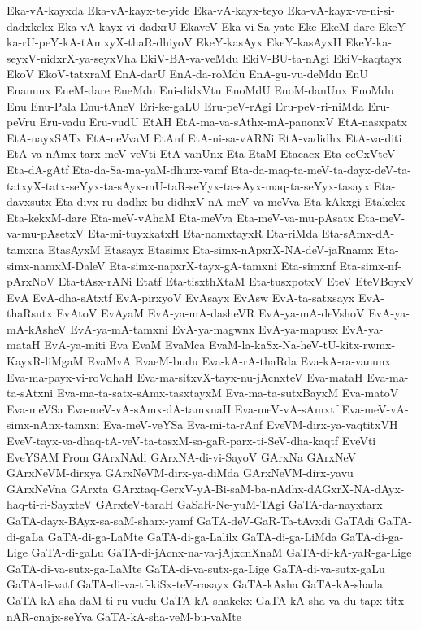 {Eka-vA-kayxda
Eka-vA-kayx-te-yide
Eka-vA-kayx-teyo
Eka-vA-kayx-ve-ni-si-dadxkekx
Eka-vA-kayx-vi-dadxrU
EkaveV
Eka-vi-Sa-yate
Eke
EkeM-dare
EkeY-ka-rU-peY-kA-tAmxyX-thaR-dhiyoV
EkeY-kasAyx
EkeY-kasAyxH
EkeY-ka-seyxV-nidxrX-ya-seyxVha
EkiV-BA-va-veMdu
EkiV-BU-ta-nAgi
EkiV-kaqtayx
EkoV
EkoV-tatxraM
EnA-darU
EnA-da-roMdu
EnA-gu-vu-deMdu
EnU
Enanunx
EneM-dare
EneMdu
Eni-didxVtu
EnoMdU
EnoM-danUnx
EnoMdu
Enu
Enu-Pala
Enu-tAneV
Eri-ke-gaLU
Eru-peV-rAgi
Eru-peV-ri-niMda
Eru-peVru
Eru-vadu
Eru-vudU
EtAH
EtA-ma-va-sAthx-mA-panonxV
EtA-nasxpatx
EtA-nayxSATx
EtA-neVvaM
EtAnf
EtA-ni-sa-vARNi
EtA-vadidhx
EtA-va-diti
EtA-va-nAmx-tarx-meV-veVti
EtA-vanUnx
Eta
EtaM
Etacacx
Eta-ceCxVteV
Eta-dA-gAtf
Eta-da-Sa-ma-yaM-dhurx-vamf
Eta-da-maq-ta-meV-ta-dayx-deV-ta-tatxyX-tatx-seYyx-ta-sAyx-mU-taR-seYyx-ta-sAyx-maq-ta-seYyx-tasayx
Eta-davxsutx
Eta-divx-ru-dadhx-bu-didhxV-nA-meV-va-meVva
Eta-kAkxgi
Etakekx
Eta-kekxM-dare
Eta-meV-vAhaM
Eta-meVva
Eta-meV-va-mu-pAsatx
Eta-meV-va-mu-pAsetxV
Eta-mi-tuyxkatxH
Eta-namxtayxR
Eta-riMda
Eta-sAmx-dA-tamxna
EtasAyxM
Etasayx
Etasimx
Eta-simx-nApxrX-NA-deV-jaRnamx
Eta-simx-namxM-DaleV
Eta-simx-napxrX-tayx-gA-tamxni
Eta-simxnf
Eta-simx-nf-pArxNoV
Eta-tAsx-rANi
Etatf
Eta-tisxthXtaM
Eta-tusxpotxV
EteV
EteVBoyxV
EvA
EvA-dha-sAtxtf
EvA-pirxyoV
EvAsayx
EvAsw
EvA-ta-satxsayx
EvA-thaRsutx
EvAtoV
EvAyaM
EvA-ya-mA-dasheVR
EvA-ya-mA-deVshoV
EvA-ya-mA-kAsheV
EvA-ya-mA-tamxni
EvA-ya-magwnx
EvA-ya-mapusx
EvA-ya-mataH
EvA-ya-miti
Eva
EvaM
EvaMca
EvaM-la-kaSx-Na-heV-tU-kitx-rwmx-KayxR-liMgaM
EvaMvA
EvaeM-budu
Eva-kA-rA-thaRda
Eva-kA-ra-vanunx
Eva-ma-payx-vi-roVdhaH
Eva-ma-sitxvX-tayx-nu-jAcnxteV
Eva-mataH
Eva-ma-ta-sAtxni
Eva-ma-ta-satx-sAmx-tasxtayxM
Eva-ma-ta-sutxBayxM
Eva-matoV
Eva-meVSa
Eva-meV-vA-sAmx-dA-tamxnaH
Eva-meV-vA-sAmxtf
Eva-meV-vA-simx-nAnx-tamxni
Eva-meV-veYSa
Eva-mi-ta-rAnf
EveVM-dirx-ya-vaqtitxVH
EveV-tayx-va-dhaq-tA-veV-ta-tasxM-sa-gaR-parx-ti-SeV-dha-kaqtf
EveVti
EveYSAM
From
GArxNAdi
GArxNA-di-vi-SayoV
GArxNa
GArxNeV
GArxNeVM-dirxya
GArxNeVM-dirx-ya-diMda
GArxNeVM-dirx-yavu
GArxNeVna
GArxta
GArxtaq-GerxV-yA-Bi-saM-ba-nAdhx-dAGxrX-NA-dAyx-haq-ti-ri-SayxteV
GArxteV-taraH
GaSaR-Ne-yuM-TAgi
GaTA-da-nayxtarx
GaTA-dayx-BAyx-sa-saM-sharx-yamf
GaTA-deV-GaR-Ta-tAvxdi
GaTAdi
GaTA-di-gaLa
GaTA-di-ga-LaMte
GaTA-di-ga-Lalilx
GaTA-di-ga-LiMda
GaTA-di-ga-Lige
GaTA-di-gaLu
GaTA-di-jAcnx-na-va-jAjxcnXnaM
GaTA-di-kA-yaR-ga-Lige
GaTA-di-va-sutx-ga-LaMte
GaTA-di-va-sutx-ga-Lige
GaTA-di-va-sutx-gaLu
GaTA-di-vatf
GaTA-di-va-tf-kiSx-teV-rasayx
GaTA-kAsha
GaTA-kA-shada
GaTA-kA-sha-daM-ti-ru-vudu
GaTA-kA-shakekx
GaTA-kA-sha-va-du-tapx-titx-nAR-cnajx-seYva
GaTA-kA-sha-veM-bu-vaMte
}
